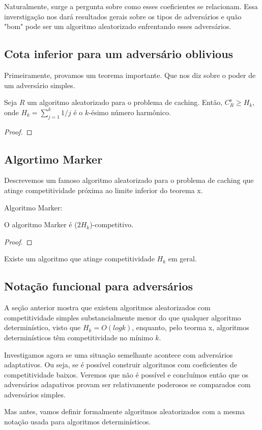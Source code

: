 Naturalmente, surge a pergunta sobre como esses coeficientes se relacionam. Essa inverstigação nos dará resultados gerais sobre os tipos de adversários e quão "bom" pode ser um algoritmo aleatorizado enfrentando esses adversários.


\subsection{Cota inferior para um adversário oblivious}

Primeiramente, provamos um teorema importante. Que nos diz sobre o poder de um adversário simples.

\begin{theorem}
  Seja \(R\) um algoritmo aleatorizado para o problema de caching. Então, \(C_R^{\text{s}} \geqslant H_k\), onde \(H_k = \sum_{j = 1}^{k} 1/j\) é o \(k\)-ésimo número harmônico.
  \begin{proof}
  \end{proof}
\end{theorem}


\subsection{Algortimo Marker}

Descrevemos um famoso algoritmo aleatorizado para o problema de caching que atinge competitividade próxima ao limite inferior do teorema x.

Algoritmo Marker: 

\begin{theorem}

  O algoritmo Marker é (\(2H_k\))-competitivo.
  
  \begin{proof}
    
  \end{proof}
  
\end{theorem}


Existe um algoritmo que atinge competitividade \(H_k\) em geral.

\subsection{Notação funcional para adversários}

A seção anterior mostra que existem algoritmos aleatorizados com competitividade simples substancialmente menor do que qualquer algoritmo determinístico, visto que \(H_k = O(log k)\), enquanto, pelo teorma x, algoritmos determinísticos têm competitividade no mínimo \(k\).

Investigamos agora se uma situação semelhante acontece com adversários adaptativos. Ou seja, se é possível construir algoritmos com coeficientes de competitividade baixos. Veremos que não é possível e concluímos então que os adversários adapativos provam ser relativamente poderosos se comparados com adversários simples.

Mas antes, vamos definir formalmente algoritmos aleatorizados com a mesma notação usada para algoritmos determinísticos.
